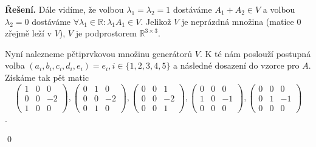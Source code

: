 \documentclass{article}
\theoremstyle{definition}
\theoremstyle{plain}
\newcommand{\R}{\mathbb{R}}
\newenvironment{reseni}{\noindent\textbf{Řešení.}\hspace{0.5em}}{\hfill\qed\medskip}
\begin{document}
\begin{reseni}
Dále vidíme, že volbou $\lambda_1 = \lambda_2 = 1$ dostáváme $A_1 + A_2 \in V$ a volbou $\lambda_2 = 0$ dostáváme $\forall \lambda_1 \in \R: \lambda_1 A_1 \in V$.
Jelikož $V$ je neprázdná množina (matice $0$ zřejmě leží v $V$), $V$ je podprostorem $\R^{3 \times 3}$.

Nyní nalezneme pětiprvkovou množinu generátorů $V$. K té nám poslouží postupná volba
$(a_i, b_i, c_i, d_i, e_i) = e_i, i \in \{1, 2, 3, 4, 5\}$ a následné dosazení do vzorce pro $A$.
Získáme tak pět matic
\[
\begin{pmatrix}
1 & 0 & 0 \\
0 & 0 & -2 \\
1 & 0 & 0
\end{pmatrix},
\begin{pmatrix}
0 & 1 & 0 \\
0 & 0 & -2 \\
0 & 1 & 0
\end{pmatrix},
\begin{pmatrix}
0 & 0 & 1 \\
0 & 0 & -2 \\
0 & 0 & 1
\end{pmatrix},
\begin{pmatrix}
0 & 0 & 0 \\
1 & 0 & -1 \\
0 & 0 & 0
\end{pmatrix},
\begin{pmatrix}
0 & 0 & 0 \\
0 & 1 & -1 \\
0 & 0 & 0
\end{pmatrix}
\]
.


\end{reseni}
\end{document}
